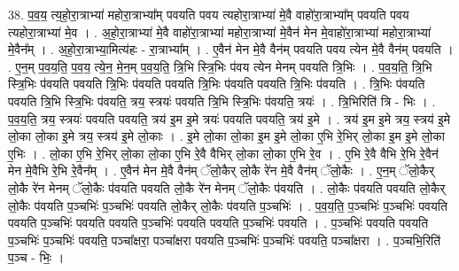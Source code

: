 \documentclass[17pt]{extarticle}
\begin{document}
38. प॒व॒य॒ त्य॒हो॒रा॒त्राभ्या॑ महोरा॒त्राभ्या᳚म् पवयति पवय त्यहोरा॒त्राभ्या॑ मे॒वै वाहो॑रा॒त्राभ्या᳚म् पवयति पवय त्यहोरा॒त्राभ्या॑ मे॒व । . अ॒हो॒रा॒त्राभ्या॑ मे॒वै वाहो॑रा॒त्राभ्या॑ महोरा॒त्राभ्या॑ मे॒वैन॑ मेन मे॒वाहो॑रा॒त्राभ्या॑ महोरा॒त्राभ्या॑ मे॒वैन᳚म् । . अ॒हो॒रा॒त्राभ्या॒मित्य॑हः - रा॒त्राभ्या᳚म् । . ए॒वैन॑ मेन मे॒वै वैन॑म् पवयति पवय त्येन मे॒वै वैन॑म् पवयति । . ए॒न॒म् प॒व॒य॒ति॒ प॒व॒य॒ त्ये॒न॒ मे॒न॒म् प॒व॒य॒ति॒ त्रि॒भि स्त्रि॒भिः प॑वय त्येन मेनम् पवयति त्रि॒भिः । . प॒व॒य॒ति॒ त्रि॒भि स्त्रि॒भिः प॑वयति पवयति त्रि॒भिः प॑वयति पवयति त्रि॒भिः प॑वयति पवयति त्रि॒भिः प॑वयति । . त्रि॒भिः प॑वयति पवयति त्रि॒भि स्त्रि॒भिः प॑वयति॒ त्रय॒ स्त्रयः॑ पवयति त्रि॒भि स्त्रि॒भिः प॑वयति॒ त्रयः॑ । . त्रि॒भिरिति॑ त्रि - भिः । . प॒व॒य॒ति॒ त्रय॒ स्त्रयः॑ पवयति पवयति॒ त्रय॑ इ॒म इ॒मे त्रयः॑ पवयति पवयति॒ त्रय॑ इ॒मे । . त्रय॑ इ॒म इ॒मे त्रय॒ स्त्रय॑ इ॒मे लो॒का लो॒का इ॒मे त्रय॒ स्त्रय॑ इ॒मे लो॒काः । . इ॒मे लो॒का लो॒का इ॒म इ॒मे लो॒का ए॒भि रे॒भिर् लो॒का इ॒म इ॒मे लो॒का ए॒भिः । . लो॒का ए॒भि रे॒भिर् लो॒का लो॒का ए॒भि रे॒वै वैभिर् लो॒का लो॒का ए॒भि रे॒व । . ए॒भि रे॒वै वैभि रे॒भि रे॒वैन॑ मेन मे॒वैभि रे॒भि रे॒वैन᳚म् । . ए॒वैन॑ मेन मे॒वै वैन॑म् ॅलो॒कैर् लो॒कै रे॑न मे॒वै वैन॑म् ॅलो॒कैः । . ए॒न॒म् ॅलो॒कैर् लो॒कै रे॑न मेनम् ॅलो॒कैः प॑वयति पवयति लो॒कै रे॑न मेनम् ॅलो॒कैः प॑वयति । . लो॒कैः प॑वयति पवयति लो॒कैर् लो॒कैः प॑वयति प॒ञ्चभिः॑ प॒ञ्चभिः॑ पवयति लो॒कैर् लो॒कैः प॑वयति प॒ञ्चभिः॑ । . प॒व॒य॒ति॒ प॒ञ्चभिः॑ प॒ञ्चभिः॑ पवयति पवयति प॒ञ्चभिः॑ पवयति पवयति प॒ञ्चभिः॑ पवयति पवयति प॒ञ्चभिः॑ पवयति । . प॒ञ्चभिः॑ पवयति पवयति प॒ञ्चभिः॑ प॒ञ्चभिः॑ पवयति॒ पञ्चा᳚क्षरा॒ पञ्चा᳚क्षरा पवयति प॒ञ्चभिः॑ प॒ञ्चभिः॑ पवयति॒ पञ्चा᳚क्षरा । . प॒ञ्चभि॒रिति॑ प॒ञ्च - भिः॒ । \newline
\pagebreak
{}
\end{document}
